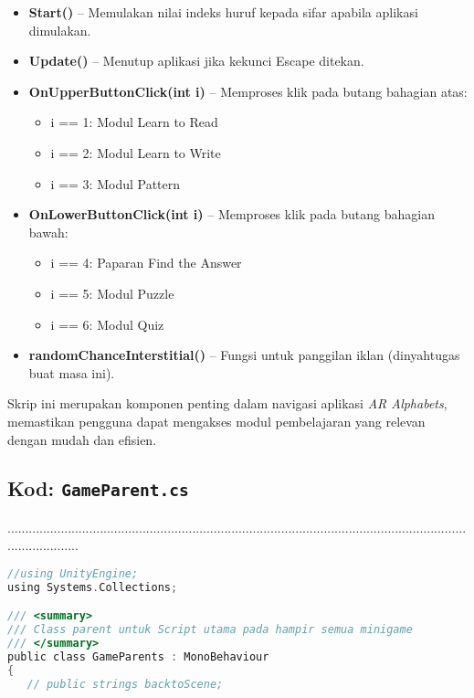\begin{itemize}
\begin{itemize}
\begin{itemize}
\begin{itemize}
\begin{itemize}
\begin{itemize}
\begin{itemize}
\begin{itemize}
\begin{flushleft}
\begin{itemize}
  \item \textbf{Start()} -- Memulakan nilai indeks huruf kepada sifar apabila aplikasi dimulakan.
  \item \textbf{Update()} -- Menutup aplikasi jika kekunci Escape ditekan.
  \item \textbf{OnUpperButtonClick(int i)} -- Memproses klik pada butang bahagian atas:
  \begin{itemize}
    \item i == 1: Modul Learn to Read
    \item i == 2: Modul Learn to Write
    \item i == 3: Modul Pattern
  \end{itemize}
  \item \textbf{OnLowerButtonClick(int i)} -- Memproses klik pada butang bahagian bawah:
  \begin{itemize}
    \item i == 4: Paparan Find the Answer
    \item i == 5: Modul Puzzle
    \item i == 6: Modul Quiz
  \end{itemize}
  \item \textbf{randomChanceInterstitial()} -- Fungsi untuk panggilan iklan (dinyahtugas buat masa ini).
\end{itemize}

\bigskip

Skrip ini merupakan komponen penting dalam navigasi aplikasi \textit{AR Alphabets}, memastikan pengguna dapat mengakses modul pembelajaran yang relevan dengan mudah dan efisien.

\newpage

\subsection*{Kod: \texttt{GameParent.cs}}
.....................................................................................................................................................
\begin{lstlisting}[language=C,caption={Kod Skrip Game Parent bagi AR Alphabets},label={lst:gameparent-script}]
//using UnityEngine;
using Systems.Collections;

/// <summary>
/// Class parent untuk Script utama pada hampir semua minigame
/// </summary>
public class GameParents : MonoBehaviour
{
   // public strings backtoScene;


\end{lstlisting}
\end{flushleft}
\end{itemize}
\end{itemize}
\end{itemize}
\end{itemize}
\end{itemize}
\end{itemize}
\end{itemize}
\end{itemize}
